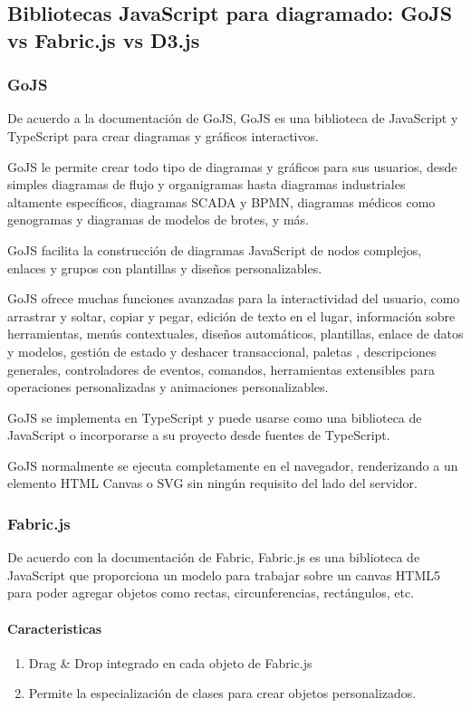 \subsection{Bibliotecas JavaScript para diagramado: GoJS vs Fabric.js vs D3.js}
\subsubsection*{GoJS}
De acuerdo a la documentación de GoJS\cite{noauthor_gojs_nodate}, GoJS es una biblioteca de JavaScript y TypeScript para crear diagramas y gráficos interactivos.


GoJS le permite crear todo tipo de diagramas y gráficos para sus usuarios, desde simples diagramas de flujo y organigramas hasta diagramas industriales altamente específicos, diagramas SCADA y BPMN, diagramas médicos como genogramas y diagramas de modelos de brotes, y más. 


GoJS facilita la construcción de diagramas JavaScript de nodos complejos, enlaces y grupos con plantillas y diseños personalizables.


GoJS ofrece muchas funciones avanzadas para la interactividad del usuario, como arrastrar y soltar, copiar y pegar, edición de texto en el lugar, información sobre herramientas, menús contextuales, diseños automáticos, plantillas, enlace de datos y modelos, gestión de estado y deshacer transaccional, paletas , descripciones generales, controladores de eventos, comandos, herramientas extensibles para operaciones personalizadas y animaciones personalizables.


GoJS se implementa en TypeScript y puede usarse como una biblioteca de JavaScript o incorporarse a su proyecto desde fuentes de TypeScript. 


GoJS normalmente se ejecuta completamente en el navegador, renderizando a un elemento HTML Canvas o SVG sin ningún requisito del lado del servidor.


\subsubsection*{Fabric.js}

De acuerdo con la documentación de Fabric\cite{noauthor_fabric_2020}, Fabric.js es una biblioteca de JavaScript que proporciona un modelo para trabajar sobre un canvas HTML5 para poder agregar objetos como rectas, circunferencias, rectángulos, etc.

\paragraph*{Caracteristicas}
\begin{enumerate}
    \item Drag \& Drop integrado en cada objeto de Fabric.js
    \item Permite la especialización de clases para crear objetos personalizados.
\end{enumerate}


